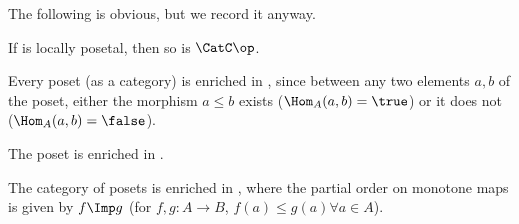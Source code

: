 %
The following is obvious, but we record it anyway.
\begin{lemma}
  \label{lem:loc_pos_op}
  If \CatC is locally posetal, then so is $\CatC\op$.
\end{lemma}

\begin{example}
  \label{ex:enrichbool}Every poset (as a category) is enriched in \Bool, since between any two elements $a,b$ of the poset, either the morphism $a \leq b$ exists ($\Hom_A(a,b) = \true$) or it does not ($\Hom_A(a,b) = \false$).
\end{example}

\begin{example}
  The poset \Bool is enriched in \Bool.
\end{example}

\begin{example}
  The category \Pos of posets is enriched in \Pos, where the partial order on monotone maps is given by $f \Imp g$ (\ie  for $f,g : A \to B$, $f(a) \leq g(a) \forall a \in A$).
\end{example}

%

